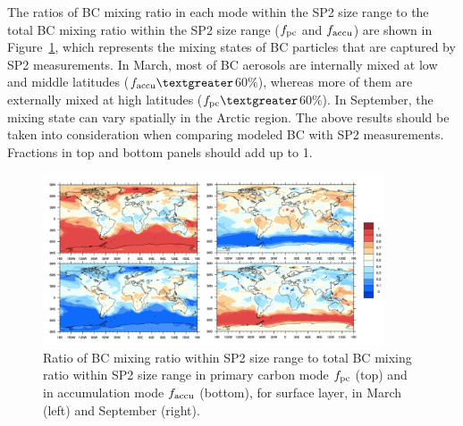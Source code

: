 \documentclass[12pt, fullpage]{uiucthesis2009_2}
\begin{document}
	The ratios of BC mixing ratio in each mode within the SP2 size range to the total BC mixing ratio within the SP2 size range ($f_{\rm pc}$ and $f_{\rm accu}$) are shown in Figure~\ref{fig_R7}, which represents the mixing states of BC particles that are captured by SP2 measurements. In March, most of BC aerosols are internally mixed at low and middle
	latitudes ($f_{\rm accu}\textgreater$60$\%$), whereas more of them are externally mixed at high latitudes ($f_{\rm pc}\textgreater$60$\%$). In September, the mixing state can vary spatially in the Arctic region. The above results should be taken into consideration when comparing modeled BC
	with SP2 measurements. Fractions in top and bottom panels should add up to 1.
	
	
	
	\begin{figure}[h] 
		\begin{center}
			\includegraphics[width = 0.9\textwidth]{Rplot04}
			\caption[Ratio of BC mixing ratio within SP2 size range to total BC mixing ratio within SP2 size range in primary carbon mode $f_{\rm pc}$ (top) and in accumulation mode $f_{\rm accu}$ (bottom), for surface layer, in March and September]{\label{fig_R7} Ratio of BC mixing ratio within SP2 size range to total BC mixing ratio within SP2 size range in primary carbon mode $f_{\rm pc}$ (top) and in accumulation mode $f_{\rm accu}$ (bottom), for surface layer, in March (left) and September (right).}
		\end{center}
	\end{figure}
	
	
\end{document}
